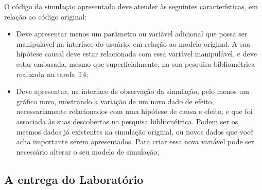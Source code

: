 O código da simulação apresentada deve atender às seguintes características, em relação ao código original:
\begin{itemize}
    \item Deve apresentar menos um parâmetro ou variável adicional que possa ser manipulável na interface do usuário, em relação ao modelo original. A sua hipótese causal deve estar relacionada com essa variável manipulável, e deve estar embasada, mesmo que superficialmente, na sua pesquisa bibliométrica realizada na tarefa T4;
    \item Deve apresentar, na interface de observação da simulação, pelo menos um gráfico novo, mostrando a variação de um novo dado de efeito, necessariamente relacionados com uma hipótese de causa e efeito, e que foi associada às suas descobertas na pesquisa bibliométrica. 
    Podem ser os mesmos dados já existentes na simulação original, ou novos dados que você acha importante serem apresentados. Para criar essa nova variável pode ser necessário alterar o seu modelo de simulação;
\end{itemize}

\subsection{A entrega do Laboratório}

